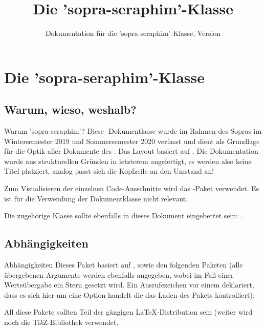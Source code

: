 \documentclass{sopra-seraphim}
\title{Die 'sopra-seraphim'-Klasse}
\subtitle{Dokumentation für die 'sopra-seraphim'-Klasse, Version \thesosversion}
\begin{document}
    \Intro

    \section{Die 'sopra-seraphim'-Klasse}
    \subsection{Warum, wieso, weshalb?}
    \begin{frame}{Warum 'sopra-seraphim'?}
        Diese \LaTeXe-Dokumentlasse wurde im Rahmen des Sopras im 
        Wintersemester 2019 und Sommersemester 2020 verfasst und dient als
        Grundlage für die Optik aller Dokumente des .
        Das Layout basiert auf . Die Dokumentation wurde aus strukturellen Gründen in letzterem angefertigt, es werden also keine Titel platziert, analog passt sich die Kopfzeile an den Umstand an!\par
        Zum Visualisieren der einzelnen Code-Ausschnitte wird das
        -Paket verwendet. Es ist für die Verwendung der Dokumentklasse
        nicht relevant.\par
        Die zugehörige Klasse sollte ebenfalls in dieses Dokument eingebettet sein: .
    \end{frame}

    \subsection{Abhängigkeiten}
    \begin{frame}[fragile]{Abhängigkeiten}
    Dieses Paket basiert auf , sowie den folgenden Paketen (alle übergebenen Argumente werden ebenfalls 
    angegeben, wobei im Fall einer Werteübergabe ein Stern gesetzt wird. Ein Ausrufezeichen vor einem  deklariert, dass es sich hier um eine Option handelt die das Laden des Pakets kontrolliert):
    \bgroup\footnotesize
    \begin{multicols}{3}
    \end{multicols}
    \egroup
    All diese Pakete sollten Teil der gängigen \LaTeX-Distribution sein (weiter
    wird noch die Ti\textit{k}Z-Bibliothek  verwendet.
    \end{frame}
\end{document}
